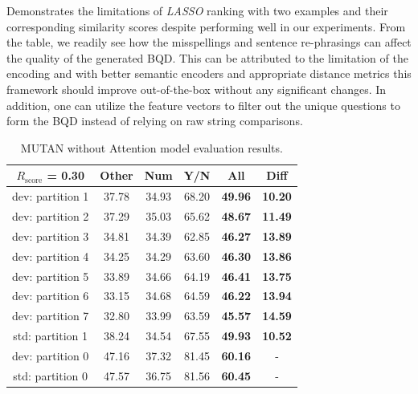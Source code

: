 \documentclass[letterpaper]{article}
\newcommand{\lasso}{}\def\lasso/{\textit{LASSO}}
\newcommand{\rscore}{}\def\rscore/{$R_{\text{score}}$}
\begin{document}
\begin{table}
\begin{subtable}{0.49\linewidth}
	\end{subtable}
	\caption{Demonstrates the limitations of \lasso/ ranking with two examples and their corresponding similarity scores despite performing well in our experiments. From the table, we readily see how the misspellings and sentence re-phrasings can affect the quality of the generated BQD. This can be attributed to the limitation of the encoding and with better semantic encoders and appropriate distance metrics this framework should improve out-of-the-box without any significant changes. In addition, one can utilize the feature vectors to filter out the unique questions to form the BQD instead of relying on raw string comparisons.}
	\label{tbl:lasso_examples}
\end{table}

\begin{table}
	\begin{subtable}{0.49\linewidth}
		\begin{adjustbox}{width=0.46\columnwidth}
\begin{tabular}{c | c c c c | c}
			\rscore/ = 0.30  & Other & Num   & Y/N   & All            & Diff           \\ [0.5ex]
			\hline
			dev: partition 1 & 37.78 & 34.93 & 68.20 & \textbf{49.96} & \textbf{10.20} \\
			dev: partition 2 & 37.29 & 35.03 & 65.62 & \textbf{48.67} & \textbf{11.49} \\
			dev: partition 3 & 34.81 & 34.39 & 62.85 & \textbf{46.27} & \textbf{13.89} \\
			dev: partition 4 & 34.25 & 34.29 & 63.60 & \textbf{46.30} & \textbf{13.86} \\
			dev: partition 5 & 33.89 & 34.66 & 64.19 & \textbf{46.41} & \textbf{13.75} \\
			dev: partition 6 & 33.15 & 34.68 & 64.59 & \textbf{46.22} & \textbf{13.94} \\
			dev: partition 7 & 32.80 & 33.99 & 63.59 & \textbf{45.57} & \textbf{14.59} \\
			\hline
			std: partition 1 & 38.24 & 34.54 & 67.55 & \textbf{49.93} & \textbf{10.52} \\
			\hline
			dev: partition 0 & 47.16 & 37.32 & 81.45 & \textbf{60.16} & -              \\
			std: partition 0 & 47.57 & 36.75 & 81.56 & \textbf{60.45} & -              \\
			\hline
		\end{tabular}
\end{adjustbox}
		\caption{MUTAN without Attention model evaluation results.}


\end{subtable}
\end{table}
\end{document}
